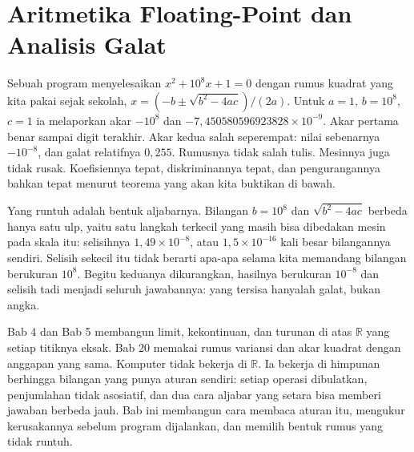 \chapter{Aritmetika Floating-Point dan Analisis Galat}

Sebuah program menyelesaikan $x^{2}+10^{8}x+1=0$ dengan rumus kuadrat yang kita pakai
sejak sekolah, $x=(-b\pm\sqrt{b^{2}-4ac})/(2a)$. Untuk $a=1$, $b=10^{8}$, $c=1$ ia
melaporkan akar $-10^{8}$ dan $-7{,}450580596923828\times10^{-9}$. Akar pertama benar
sampai digit terakhir. Akar kedua salah seperempat: nilai sebenarnya $-10^{-8}$, dan
galat relatifnya $0{,}255$. Rumusnya tidak salah tulis. Mesinnya juga tidak rusak.
Koefisiennya tepat, diskriminannya tepat, dan pengurangannya bahkan tepat menurut
teorema yang akan kita buktikan di bawah.

Yang runtuh adalah bentuk aljabarnya. Bilangan $b=10^{8}$ dan $\sqrt{b^{2}-4ac}$ berbeda
hanya satu ulp, yaitu satu langkah terkecil yang masih bisa dibedakan mesin pada skala
itu: selisihnya $1{,}49\times10^{-8}$, atau $1{,}5\times10^{-16}$ kali besar bilangannya
sendiri. Selisih sekecil itu tidak berarti apa-apa selama kita memandang bilangan
berukuran $10^{8}$. Begitu keduanya dikurangkan, hasilnya berukuran $10^{-8}$ dan
selisih tadi menjadi seluruh jawabannya: yang tersisa hanyalah galat, bukan angka.

Bab 4 dan Bab 5 membangun limit, kekontinuan, dan turunan di atas $\mathbb{R}$ yang
setiap titiknya eksak. Bab 20 memakai rumus variansi dan akar kuadrat dengan anggapan
yang sama. Komputer tidak bekerja di $\mathbb{R}$. Ia bekerja di himpunan berhingga
bilangan yang punya aturan sendiri: setiap operasi dibulatkan, penjumlahan tidak
asosiatif, dan dua cara aljabar yang setara bisa memberi jawaban berbeda jauh. Bab ini
membangun cara membaca aturan itu, mengukur kerusakannya sebelum program dijalankan,
dan memilih bentuk rumus yang tidak runtuh.

